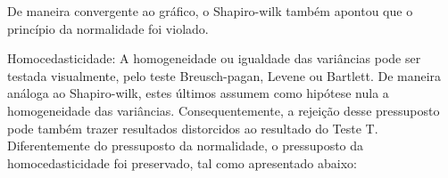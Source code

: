 \documentclass[
]{book}
\newenvironment{Shaded}{\begin{snugshade}}{\end{snugshade}}
\newcommand{\DataTypeTok}[1]{\textcolor[rgb]{0.13,0.29,0.53}{#1}}
\newcommand{\DecValTok}[1]{\textcolor[rgb]{0.00,0.00,0.81}{#1}}
\newcommand{\KeywordTok}[1]{\textcolor[rgb]{0.13,0.29,0.53}{\textbf{#1}}}
\newcommand{\NormalTok}[1]{#1}
\newcommand{\OperatorTok}[1]{\textcolor[rgb]{0.81,0.36,0.00}{\textbf{#1}}}
\newcommand{\StringTok}[1]{\textcolor[rgb]{0.31,0.60,0.02}{#1}}
\begin{document}
De maneira convergente ao gráfico, o Shapiro-wilk também apontou que o
princípio da normalidade foi violado.

Homocedasticidade: A homogeneidade ou igualdade das variâncias pode ser
testada visualmente, pelo teste Breusch-pagan, Levene ou Bartlett. De
maneira análoga ao Shapiro-wilk, estes últimos assumem como hipótese
nula a homogeneidade das variâncias. Consequentemente, a rejeição desse
pressuposto pode também trazer resultados distorcidos ao resultado do
Teste T. Diferentemente do pressuposto da normalidade, o pressuposto da
homocedasticidade foi preservado, tal como apresentado abaixo:

\begin{Shaded}
\end{Shaded}
\end{document}
